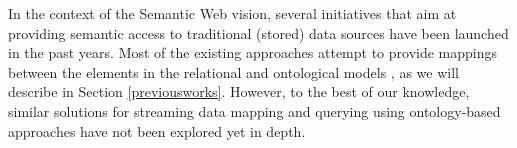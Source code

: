 In the context of the Semantic Web vision, several initiatives that aim at providing semantic access to traditional
(stored) data sources have been launched in the past years. Most of the existing approaches attempt to provide mappings
between the elements in the relational and ontological models \cite{Sahoo_09}, as we will describe in Section
\ref{previousworks}. However, to the best of our knowledge, similar solutions for streaming data mapping and querying
using ontology-based approaches have not been explored yet in depth.

